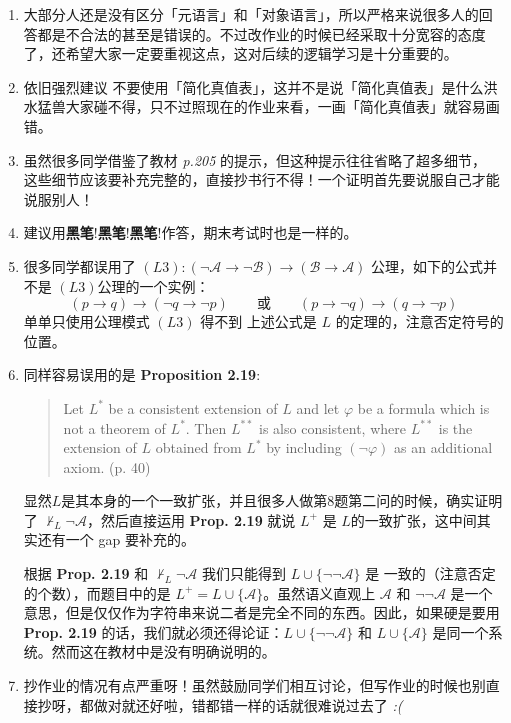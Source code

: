 \documentclass[UTF8,12pt,a4paper]{ctexart}
\begin{document}
\begin{enumerate}
	\item 大部分人还是没有区分「元语言」和「对象语言」，所以严格来说很多人的回答都是不合法的甚至是错误的。不过改作业的时候已经采取十分宽容的态度了，还希望大家一定要重视这点，这对后续的逻辑学习是十分重要的。
	
	\item 依旧强烈建议{\color{purple} 不要}使用「简化真值表」，这并不是说「简化真值表」是什么洪水猛兽大家碰不得，只不过照现在的作业来看，一画「简化真值表」就容易画错。
	
	\item 虽然很多同学借鉴了教材 \textit{p.205} 的提示，但这种提示往往省略了超多细节，
	这些细节应该要补充完整的，直接抄书行不得！一个证明首先要说服自己才能说服别人！
	
	\item 建议用\textbf{黑笔}!\textbf{黑笔}!\textbf{黑笔}!作答，期末考试时也是一样的。
	
	\item 很多同学都误用了 $(L3): (\neg \mathscr{A} \to \neg \mathscr{B}) \to (\mathscr{B} \to \mathscr{A})$ 公理，如下的公式并{\color{purple} 不是} $(L3)$公理的一个实例：
	\[
	(p \to q) \to (\neg q \to \neg p)  \qquad \text{或} \qquad
	(p \to \neg q) \to (q \to \neg p)
	\]
	单单只使用公理模式 $(L3)$ 得不到 上述公式是 $L$ 的定理的，注意否定符号的位置。
	
	
	\item 同样容易误用的是 \textbf{Proposition 2.19}:
	\begin{quotation}
		Let $L^\ast$ be a consistent extension of $L$ and let $\varphi$ be a formula which is not a theorem of $L^\ast$. Then $L^{\ast\ast}$ is also consistent, where $L^{\ast\ast}$ is the extension of $L$ obtained from $L^\ast$ by including $(\neg \varphi)$ as an additional axiom. (p. 40)
	\end{quotation}
	显然$L$是其本身的一个一致扩张，并且很多人做第8题第二问的时候，确实证明了 $\not \vdash_L \neg \mathscr{A}$，然后直接运用 \textbf{Prop. 2.19} 就说 $L^+$ 是 $L$的一致扩张，这中间其实还有一个 gap 要补充的。
	
	根据 \textbf{Prop. 2.19} 和 $\not \vdash_L \neg \mathscr{A}$ 我们只能得到 $L \cup \{ \neg \neg \mathscr{A}\}$ 是 一致的（注意否定的个数），而题目中的是 $L^+ = L \cup \{ \mathscr{A}\}$。虽然语义直观上 $\mathscr{A}$ 和 $\neg \neg \mathscr{A}$ 是一个意思，但是仅仅作为字符串来说二者是完全不同的东西。因此，如果硬是要用 \textbf{Prop. 2.19} 的话，我们就必须还得论证：$L \cup \{ \neg \neg \mathscr{A}\}$ 和 $  L \cup \{ \mathscr{A} \}$ 是同一个系统。然而这在教材中是没有明确说明的。
	
	\item 抄作业的情况有点严重呀！虽然鼓励同学们相互讨论，但写作业的时候也别直接抄呀，都做对就还好啦，错都错一样的话就很难说过去了 \textit{:(} 
\end{enumerate}
\end{document}
